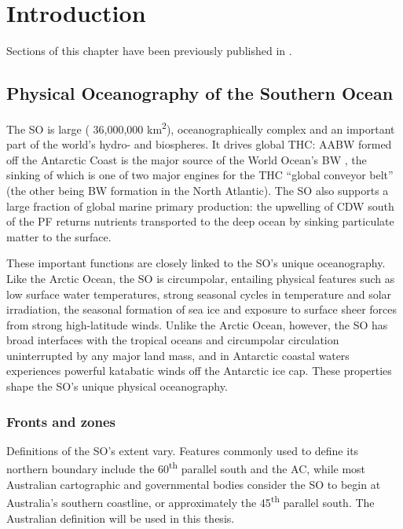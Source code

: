 \chapter{Introduction} 
\label{ch:intro}

Sections of this chapter have been previously published in .

\section{Physical Oceanography of the Southern Ocean}

The \ac{SO} is large (\textapprox{} 36,000,000 km\textsuperscript{2}), oceanographically complex and an important part of the world's hydro- and biospheres.
It drives global \ac{THC}: \ac{AABW} formed off the Antarctic Coast is the major source of the World Ocean's \ac{BW} \cite{Jacobs:2004hv}, the sinking of which is one of two major engines for the \ac{THC} ``global conveyor belt'' (the other being \ac{BW} formation in the North Atlantic).
The \ac{SO} also supports a large fraction of global marine primary production: the upwelling of \ac{CDW} south of the \ac{PF} returns nutrients transported to the deep ocean by sinking particulate matter \cite{Rath:1998wm} to the surface.

These important functions are closely linked to the \ac{SO}'s unique oceanography.
Like the Arctic Ocean, the \ac{SO} is circumpolar, entailing physical features such as low surface water temperatures, strong seasonal cycles in temperature and solar irradiation, the seasonal formation of sea ice and exposure to surface sheer forces from strong high-latitude winds.
Unlike the Arctic Ocean, however, the \ac{SO} has broad interfaces with the tropical oceans and circumpolar circulation uninterrupted by any major land mass, and in Antarctic coastal waters experiences powerful katabatic winds off the Antarctic ice cap.
These properties shape the \ac{SO}'s unique physical oceanography.

\subsection{Fronts and zones}

Definitions of the \ac{SO}'s extent vary.
Features commonly used to define its northern boundary include the 60\textsuperscript{th} parallel south and the \ac{AC}, while most Australian cartographic and governmental bodies consider the \ac{SO} to begin at Australia's southern coastline, or approximately the 45\textsuperscript{th} parallel south.
The Australian definition will be used in this thesis.

